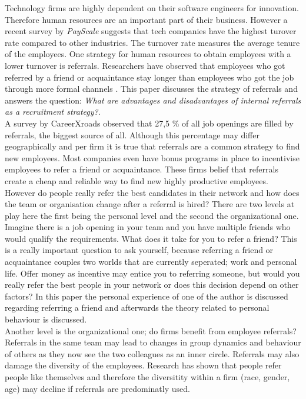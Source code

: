 \documentclass[main.tex]{subfiles}
\begin{document}
Technology firms are highly dependent on their software engineers for innovation. Therefore human resources are an important part of their business. However a recent survey by \textit{PayScale} \cite{turnover} suggests that tech companies have the highest turover rate compared to other industries. The turnover rate measures the average tenure of the employees. One strategy for human resources to obtain employees with a lower turnover is referrals. Researchers have observed that employees who got referred by a friend or acquaintance stay longer than employees who got the job through more formal channels \cite{sixth,tenth}. This paper discusses the strategy of referrals and answers the question: \emph{What are advantages and disadvantages of internal referrals as a recruitment strategy?}. \\

A survey by CareerXroads \cite{referralpercentage} observed that 27,5 \% of all job openings are filled by referrals, the biggest source of all. Although this percentage may differ geographically and per firm it is true that referrals are a common strategy to find new employees. Most companies even have bonus programs in place to  incentivise employees to refer a friend or acquaintance. These firms belief that referrals create a cheap \cite{fourth} and reliable way to find new highly productive employees. However do people really refer the best candidates in their network and how does the team or organisation change after a referral is hired? There are two levels at play here the first being the personal level and the second the organizational one. \\

Imagine there is a job opening in your team and you have multiple friends who would qualify the requirements. What does it take for you to refer a friend? This is a really important question to ask yourself, because referring a friend or acquaintance couples two worlds that are currently seperated; work and personal life. Offer money as incentive may entice you to referring someone, but would you really refer the best people in your network or does this decision depend on other factors? In this paper the personal experience of one of the author is discussed regarding referring a friend and afterwards the theory related to personal behaviour is discussed. \\

Another level is the organizational one; do firms benefit from employee referrals? Referrals in the same team may lead to changes in group dynamics and behaviour of others as they now see the two colleagues as an inner circle. Referrals may also damage the diversity of the employees. Research has shown that people refer people like themselves \cite{third} and therefore the diversitity within a firm (race, gender, age) may decline if referrals are predominatly used.\\
\end{document}

